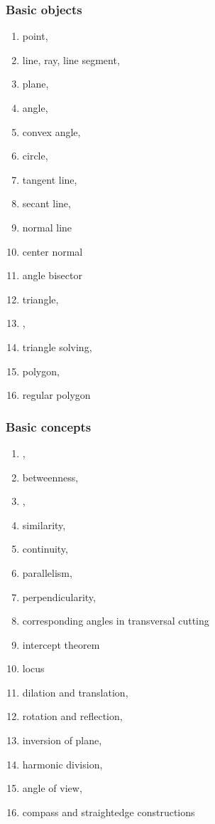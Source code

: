\documentclass[12pt]{article}
\begin{document}
\subsubsection*{Basic objects}
\begin{enumerate}
\item point, 
\item line, ray, line segment, 
\item plane,
\item angle,
\item convex angle,
\item circle,
\item tangent line,
\item secant line,
\item normal line
\item center normal
\item angle bisector
\item triangle,
\item {},
\item triangle solving,
\item polygon,
\item regular polygon 
\end{enumerate}

\subsubsection*{Basic concepts}
\begin{enumerate}
\item {}, 
\item betweenness,
\item {},
\item similarity,
\item continuity,
\item parallelism,
\item perpendicularity,
\item corresponding angles in transversal cutting
\item intercept theorem
\item locus
\item dilation and translation,
\item rotation and reflection,
\item inversion of plane,
\item harmonic division,
\item angle of view,
\item compass and straightedge constructions
\end{enumerate}
\end{document}

